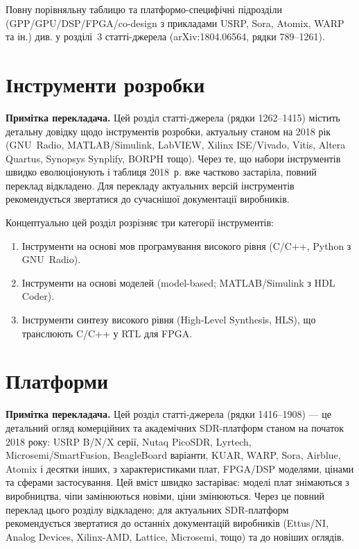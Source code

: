 \documentclass[journal]{IEEEtran}
\begin{document}
Повну порівняльну таблицю та платформо-специфічні підрозділи (GPP/GPU/DSP/FPGA/co-design з прикладами USRP, Sora, Atomix, WARP та ін.) див. у розділі~3 статті-джерела (arXiv:1804.06564, рядки 789--1261).


\section{Інструменти розробки}
\label{tools}

\textbf{Примітка перекладача.} Цей розділ статті-джерела (рядки 1262--1415) містить детальну довідку щодо інструментів розробки, актуальну станом на 2018 рік (GNU~Radio, MATLAB/Simulink, LabVIEW, Xilinx ISE/Vivado, Vitis, Altera Quartus, Synopsys Synplify, BORPH тощо). Через те, що набори інструментів швидко еволюціонують і таблиця 2018~р. вже частково застаріла, повний переклад відкладено. Для перекладу актуальних версій інструментів рекомендується звертатися до сучаснішої документації виробників.

Концептуально цей розділ розрізняє три категорії інструментів:
\begin{enumerate}
\item Інструменти на основі мов програмування високого рівня (C/C++, Python з GNU~Radio).
\item Інструменти на основі моделей (model-based; MATLAB/Simulink з HDL Coder).
\item Інструменти синтезу високого рівня (High-Level Synthesis, HLS), що транслюють C/C++ у RTL для FPGA.
\end{enumerate}


\section{Платформи}
\label{plat}

\textbf{Примітка перекладача.} Цей розділ статті-джерела (рядки 1416--1908) — це детальний огляд комерційних та академічних SDR-платформ станом на початок 2018 року: USRP B/N/X серії, Nutaq PicoSDR, Lyrtech, Microsemi/SmartFusion, BeagleBoard варіанти, KUAR, WARP, Sora, Airblue, Atomix і десятки інших, з характеристиками плат, FPGA/DSP моделями, цінами та сферами застосування. Цей вміст швидко застаріває: моделі плат знімаються з виробництва, чіпи замінюються новіми, ціни змінюються. Через це повний переклад цього розділу відкладено; для актуальних SDR-платформ рекомендується звертатися до останніх документацій виробників (Ettus/NI, Analog Devices, Xilinx-AMD, Lattice, Microsemi, тощо) та до новіших оглядів.
\end{document}
